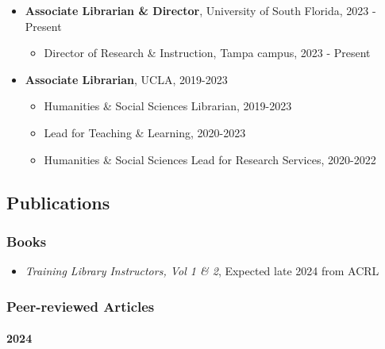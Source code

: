 \documentclass[
  letterpaper,
  DIV=11,
  numbers=noendperiod]{scrartcl}
\let\oldparagraph\paragraph
\renewcommand{\paragraph}[1]{\oldparagraph{#1}\mbox{}}
\providecommand{\tightlist}{%
  \setlength{\itemsep}{0pt}\setlength{\parskip}{0pt}}\usepackage{longtable,booktabs,array}
\begin{document}
\begin{itemize}
\tightlist
\item
  \textbf{Associate Librarian \& Director}, University of South Florida,
  2023 - Present

  \begin{itemize}
  \tightlist
  \item
    Director of Research \& Instruction, Tampa campus, 2023 - Present
  \end{itemize}
\item
  \textbf{Associate Librarian}, UCLA, 2019-2023

  \begin{itemize}
  \tightlist
  \item
    Humanities \& Social Sciences Librarian, 2019-2023
  \item
    Lead for Teaching \& Learning, 2020-2023
  \item
    Humanities \& Social Sciences Lead for Research Services, 2020-2022
  \end{itemize}
\end{itemize}

\subsection{\texorpdfstring{
Publications}{ Publications}}\label{publications}

\subsubsection{\texorpdfstring{ Books}{ Books}}\label{books}

\begin{itemize}
\tightlist
\item
  \emph{Training Library Instructors, Vol 1 \& 2}, Expected late 2024
  from ACRL
\end{itemize}

\subsubsection{\texorpdfstring{ Peer-reviewed
Articles}{ Peer-reviewed Articles}}\label{peer-reviewed-articles}

\paragraph{2024}\label{section}

\label{published-papers-2024}
\end{document}
